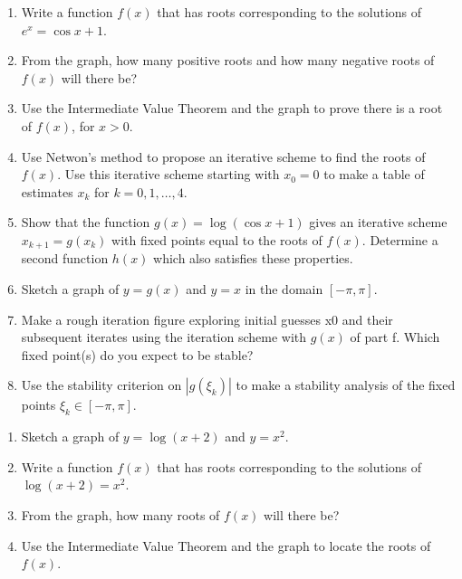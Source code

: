 {\begin{enumerate}[label=\alph*)]
	\item Write a function $f(x)$ that has roots corresponding to the solutions of $e^x=\cos x + 1$.
	
	\item From the graph, how many positive roots and how many negative roots of $f(x)$ will there be?
	
	\item Use the Intermediate Value Theorem and the graph to prove there is a root of $f(x)$, for $x>0$.
	
	\item Use Netwon's method to propose an iterative scheme to find the roots of $f(x)$. Use this iterative scheme starting with $x_0=0$ to make a table of estimates $x_k$ for $k=0,1,\dots ,4$.
	
	\item Show that the function $g(x)=\log(\cos x + 1)$ gives an iterative scheme $x_{k+1} = g(x_k)$ with fixed points equal to the roots of $f(x)$. Determine a second function $h(x)$ which also satisfies these properties.
	
	\item Sketch a graph of $y=g(x)$ and $y=x$ in the domain $[-\pi,\pi]$. 
	
	\item Make a rough iteration figure exploring initial guesses x0 and their subsequent iterates using the iteration scheme with $g(x)$ of part f. Which fixed point(s) do you expect to be stable?
	
	\item Use the stability criterion on $|g(\xi_k)|$ to make a stability analysis of the fixed points $\xi_k \in [-\pi,\pi]$.
\end{enumerate}



\begin{enumerate}[label=\alph*)]
	\item Sketch a graph of $y=\log(x+2)$ and $y=x^2$. 
	
	\item Write a function $f(x)$ that has roots corresponding to the solutions of $\log(x+2)=x^2$.
	
	\item From the graph, how many roots of $f(x)$ will there be?
	
	\item Use the Intermediate Value Theorem and the graph to locate the roots of $f(x)$.
	

\end{enumerate}}

